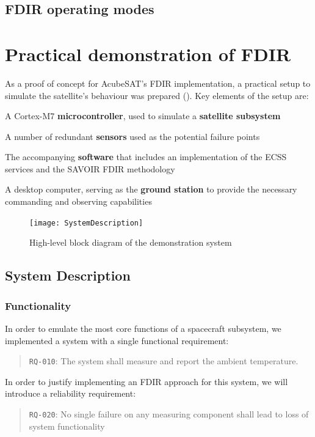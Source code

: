 \documentclass[a4paper,nobib]{tufte-book}
\begin{document}
\section{\ac{FDIR} operating modes}
\label{sec:fdir_operating_modes}

\chapter{Practical demonstration of \ac{FDIR}}

As a proof of concept for AcubeSAT's \ac{FDIR} implementation, a practical setup to simulate the satellite's behaviour was prepared (). Key elements of the setup are:
\begin{compactitem}
	\item A Cortex-M7 \textbf{microcontroller}, used to simulate a \textbf{satellite subsystem}
	\item A number of redundant \textbf{sensors} used as the potential failure points
	\item The accompanying \textbf{software} that includes an implementation of the \ac{ECSS} services and the \ac{SAVOIR} \ac{FDIR} methodology
	\item A desktop computer, serving as the \textbf{ground station} to provide the necessary commanding and observing capabilities
\end{compactitem}

\begin{figure}[h]
	\texttt{[image: SystemDescription]}
	\caption{High-level block diagram of the demonstration system}
	\label{fig:block}
\end{figure}

\section{System Description}

\subsection{Functionality}
\label{sec:tsvcd}

In order to emulate the most core functions of a spacecraft subsystem, we implemented a system with a single functional requirement:
\begin{quote}
	\texttt{RQ-010}: The system shall measure and report the ambient temperature.
\end{quote}

In order to justify implementing an \ac{FDIR} approach for this system, we will introduce a reliability requirement:
\begin{quote}
	\texttt{RQ-020}: No single failure on any measuring component shall lead to loss of system functionality
\end{quote}
\end{document}
